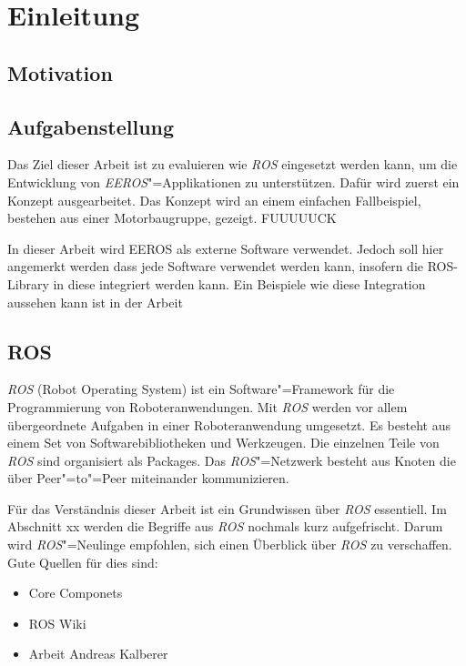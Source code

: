 \chapter{Einleitung}
\section{Motivation}


\section{Aufgabenstellung}
Das Ziel dieser Arbeit ist zu evaluieren wie \textit{ROS} eingesetzt werden kann, um die Entwicklung von \textit{EEROS}"=Applikationen zu unterstützen.
Dafür wird zuerst ein Konzept ausgearbeitet.
Das Konzept wird an einem einfachen Fallbeispiel, bestehen aus einer Motorbaugruppe, gezeigt.
FUUUUUCK



In dieser Arbeit wird EEROS als externe Software verwendet.
Jedoch soll hier angemerkt werden dass jede Software verwendet werden kann, insofern die ROS-Library in diese integriert werden kann.
Ein Beispiele wie diese Integration aussehen kann ist in der Arbeit %


\section{ROS}
\textit{ROS} (Robot Operating System) ist ein Software"=Framework für die Programmierung von Roboteranwendungen.
Mit \textit{ROS} werden vor allem übergeordnete Aufgaben in einer Roboteranwendung umgesetzt.
Es besteht aus einem Set von Softwarebibliotheken und Werkzeugen.
Die einzelnen Teile von \textit{ROS} sind organisiert als Packages.
Das \textit{ROS}"=Netzwerk besteht aus Knoten die über Peer"=to"=Peer miteinander kommunizieren.

Für das Verständnis dieser Arbeit ist ein Grundwissen über \textit{ROS} essentiell.
Im Abschnitt xx werden die Begriffe aus \textit{ROS} nochmals kurz aufgefrischt. %
Darum wird \textit{ROS}"=Neulinge empfohlen, sich einen Überblick über \textit{ROS} zu verschaffen.
Gute Quellen für dies sind:
\begin{itemize}
\item Core Componets %
\item ROS Wiki
\item Arbeit Andreas Kalberer
\end{itemize}


